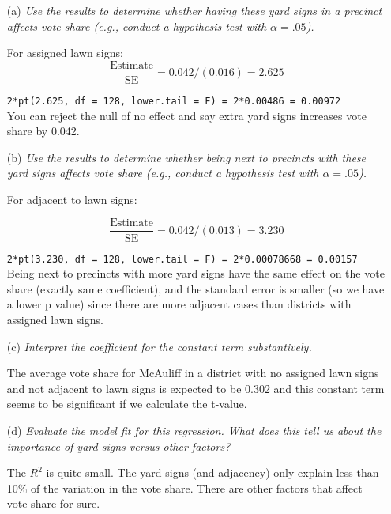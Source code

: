\documentclass[12pt,letterpaper]{article}
\begin{document}
\begin{enumerate}
	\item [(a)] \textit{Use the results to determine whether having these yard signs in a precinct affects vote share (e.g., conduct a hypothesis test with $\alpha = .05$).}
	
	For assigned lawn signs:
	$$\frac{\text{Estimate}}{\text{SE}} =  0.042/(0.016) = 2.625$$
	
	\texttt{2*pt(2.625, df = 128, lower.tail = F) = 2*0.00486 = 0.00972}\\
	
	You can reject the null of no effect and say extra yard signs increases vote share by 0.042.
	
	\item [(b)]  \textit{Use the results to determine whether being
		next to precincts with these yard signs affects vote
		share (e.g., conduct a hypothesis test with $\alpha = .05$).}
	
	For adjacent to lawn signs:
	
	$$\frac{\text{Estimate}}{\text{SE}} =  0.042/(0.013) = 3.230$$
	
	\texttt{2*pt(3.230, df = 128, lower.tail = F) = 2*0.00078668 = 0.00157}\\
	
	Being next to precincts with more yard signs have the same effect on the vote share (exactly same coefficient), and the standard error is smaller (so we have a lower p value) since there are more adjacent cases than districts with assigned lawn signs.
	
	\item [(c)] \textit{Interpret the coefficient for the constant term substantively.}
	
	The average vote share for McAuliff in a district with no assigned lawn signs and not adjacent to lawn signs is expected to be 0.302 and this constant term seems to be significant if we calculate the t-value.
	
	\item [(d)] \textit{Evaluate the model fit for this regression.  What does this tell us about the importance of yard signs versus other factors?}
	
	The $R^2$ is quite small. The yard signs (and adjacency) only explain less than 10\% of the variation in the vote share. There are other factors that affect vote share for sure.
	
\end{enumerate}  
\end{document}
